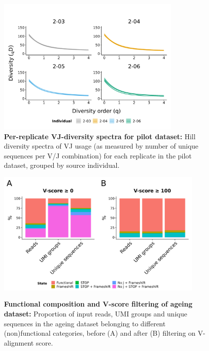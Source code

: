 \begin{figure}
\centering
\includegraphics[width = 0.8\textwidth]{_Figures/png/pilot-vj-diversity-solo-spectra}
\caption[Per-replicate VJ-diversity spectra for pilot dataset]{\textbf{Per-replicate VJ-diversity spectra for pilot dataset:} Hill diversity spectra of VJ usage (as measured by number of unique sequences per V/J combination) for each replicate in the \igseq pilot dataset, grouped by source individual.}
\label{fig:igseq-pilot-vj-diversity-solo-spectra}
\end{figure}

\begin{figure}
\centering
\includegraphics[width = 0.9\textwidth]{_Figures/png/ageing-functional-prop}
\begin{subfigure}{0em}
\label{fig:igseq-ageing-functional-prop-pre}
\end{subfigure}
\begin{subfigure}{0em}
\label{fig:igseq-ageing-functional-prop-post}
\end{subfigure}
\caption[Functional composition and V-score filtering of \igseq ageing dataset]{\textbf{Functional composition and V-score filtering of \igseq ageing dataset:} Proportion of input reads, UMI groups and unique sequences in the \igseq ageing dataset belonging to different (non)functional categories, before (A) and after (B) filtering on V-alignment score.}
\label{fig:igseq-ageing-functional-prop}
\end{figure}

